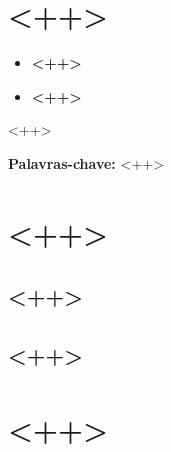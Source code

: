 \documentclass[chapter=TITLE,oneside]{abntex2} %
\begin{document}
\imprimircapa

\imprimirfolhaderosto

\tableofcontents

\chapter{<++>}\label{sec:<++>}

\begin{itemize}
    \item \textbf{<++>}
    \item \textbf{<++>}
\end{itemize}

\begin{resumo}
\noindent
    <++>
    \vspace{\onelineskip}

    \noindent
    \textbf{Palavras-chave:} <++>
\end{resumo}

\textual

\chapter{<++>}\label{sec:<++>}

\section{<++>}\label{sec:<++>}

\begin{alineas}

\item <++>

\section{<++>}\label{sec:<++>}

    \item <++>
    \item <++>
    \item <++>

\end{alineas}

\chapter{<++>}\label{sec:<++>}

\begin{alineas}
    \item <++>
    \item <++>
    \item <++>
\end{alineas}
\end{document}
